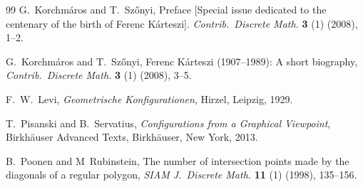\documentclass[12pt]{article}
\theoremstyle{definition} \newtheorem*{definition}              {Definition}
\theoremstyle{definition} \newtheorem {remark}                   {Remark}
\theoremstyle{definition} \newtheorem*{problem}                {Problem}
\theoremstyle{definition} \newtheorem{example}     [thm]{Example}
\begin{document}
\begin{thebibliography}{99}
G.\ Korchmáros and T.\ Szőnyi,
Preface [Special issue dedicated to the centenary of the birth of Ferenc Kárteszi].
\emph{Contrib.\ Discrete Math.} {\bf 3} (1) (2008), 1--2.

G.\ Korchmáros and T.\ Szőnyi,
Ferenc K\'arteszi (1907--1989): A short biography,
\emph{Contrib.\ Discrete Math.} {\bf 3} (1) (2008), 3--5.

F.\ W.\ Levi, 
\emph{Geometrische Konfigurationen}, Hirzel, Leipzig, 1929.

T.\ Pisanski and B.\ Servatius,
\emph{Configurations from a Graphical Viewpoint}, 
Birk\-h\"auser Advanced Texts, 
Birkh\"auser, New York, 2013.

B.\ Poonen and M\ Rubinstein,
The number of intersection points made by the diagonals of a regular polygon,
\emph{SIAM J.\ Discrete Math.} {\bf 11} (1) (1998), 135--156. 

\end{thebibliography}
\end{document}
